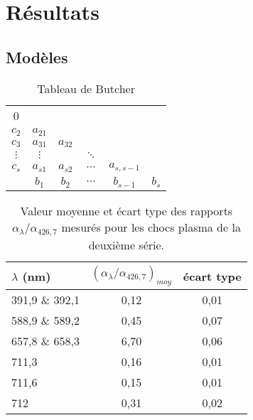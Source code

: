 \chapter{ Résultats}
\chaptertoc{}

\section{Modèles}

	\begin{table}[h!tbp]
		\begin{center}
			\begin{tabular}{c|*{5}{c}}
			0\\
			$c_2$    & $a_{21}$\\
			$c_3$    & $a_{31}$ & $a_{32}$\\
			$\vdots$ & $\vdots$ &           & $\ddots$\\
			$c_s$    & $a_{s1}$ & $a_{s2}$  & $\cdots$ & $a_{s,s - 1}$\\
			\hline
			         & $b_1$    & $b_2$     & $\cdots$ & $b_{s-1}$     & $b_s$\\
			\end{tabular}
		\end{center}
		\caption{Tableau de Butcher}
		\label{table:butcher}
	\end{table}

	\begin{table}[h!tbp]
		\begin{center}
			\begin{tabular}{@{}lcc@{}} \toprule
			$\lambda$ (nm) & $(\alpha_{\lambda}/\alpha_{426,7})_{moy}$ & écart type \\ \midrule
			391,9 \& 392,1 & 0,12 & 0,01 \\
			588,9 \& 589,2 & 0,45 & 0,07 \\
			657,8 \& 658,3 & 6,70 & 0,06 \\
			711,3 & 0,16 & 0,01 \\
			711,6 & 0,15 & 0,01 \\
			712 & 0,31 & 0,02 \\ \bottomrule
			\end{tabular}
		\end{center}
		\caption[Valeur moyenne et écart type des rapports $\alpha_{\lambda}/\alpha_{426,7}$]{Valeur moyenne et écart type des rapports $\alpha_{\lambda}/\alpha_{426,7}$ mesurés pour les chocs plasma de la deuxième série.}
		\label{table:alpha}
	\end{table}

